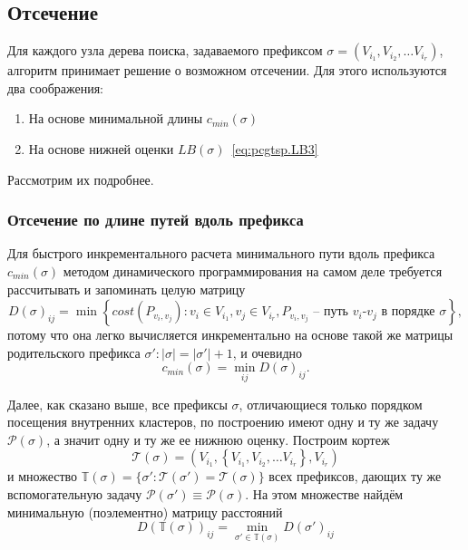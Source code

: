 
\subsection{Отсечение}
\label{sec:pgstcp.cut}

Для каждого узла дерева поиска,
задаваемого префиксом
$\sigma=(V_{i_1}, V_{i_2}, \dots V_{i_r})$,
алгоритм принимает решение
о возможном отсечении.
Для этого используются два соображения:

\begin{enumerate}
  \item На основе минимальной длины $c_{min}(\sigma)$
  \item На основе нижней оценки $LB(\sigma)$~\eqref{eq:pcgtsp.LB3}
\end{enumerate}

Рассмотрим их подробнее.

\subsubsection{%
Отсечение по длине путей вдоль префикса
}

Для быстрого инкрементального расчета
минимального пути вдоль префикса
$c_{min}(\sigma)$
методом динамического программирования
на самом деле требуется рассчитывать
и запоминать целую матрицу
\begin{equation}
  \label{eq:pcgtsp.cut.matrix}
D(\sigma)_{ij} = \min\left\{
  cost(P_{v_i,v_j})\colon
  v_i \in V_{i_1},
  v_j \in V_{i_r},
  P_{v_i,v_j} \text{ -- путь $v_i$-$v_j$ в порядке } \sigma
\right\}
,
\end{equation}
потому что она легко вычисляется
инкрементально на основе такой же матрицы
родительского префикса $\sigma': |\sigma| = |\sigma'|+1$,
и очевидно
\begin{equation}
  \label{eq.pcgtsp.c_min.dp}
  c_{min}(\sigma) = \min_{ij} D(\sigma)_{ij}
  .
\end{equation}

Далее, как сказано выше,
все префиксы $\sigma$,
отличающиеся только порядком
посещения внутренних кластеров,
по построению имеют одну и ту же задачу
$\mathcal P(\sigma)$,
а значит одну и ту же ее нижнюю оценку.
Построим кортеж
\begin{equation}
  \label{eq:pcgtsp.cut.key}
  \mathcal T(\sigma) = (V_{i_1},
  \left\{V_{i_1}, V_{i_2}, \dots V_{i_r} \right\}, V_{i_r})
\end{equation}
и множество
$
\mathbb T(\sigma) =\{\sigma' \colon \mathcal T(\sigma')=\mathcal T(\sigma)\}$
всех префиксов,
дающих ту же вспомогательную задачу
$\mathcal P(\sigma')\equiv \mathcal P(\sigma)$.
На этом множестве найдём минимальную
(поэлементно)
матрицу расстояний
$$
D(\mathbb T(\sigma))_{ij} =
  \min_{\sigma' \in \mathbb T(\sigma)} D(\sigma')_{ij}
$$


